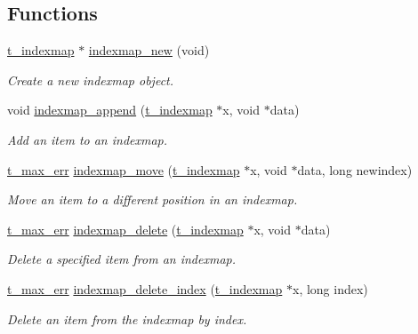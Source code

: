 \subsection*{Functions}
\begin{DoxyCompactItemize}
\item 
\hyperlink{structt__indexmap}{t\_\-indexmap} $\ast$ \hyperlink{group__indexmap_ga2e7303d05103b7e42c1a12929f5233ec}{indexmap\_\-new} (void)
\begin{DoxyCompactList}\small\item\em Create a new indexmap object. \item\end{DoxyCompactList}\item 
void \hyperlink{group__indexmap_ga5083e00af855e9b1a20ee5321c8fe3c9}{indexmap\_\-append} (\hyperlink{structt__indexmap}{t\_\-indexmap} $\ast$x, void $\ast$data)
\begin{DoxyCompactList}\small\item\em Add an item to an indexmap. \item\end{DoxyCompactList}\item 
\hyperlink{group__datatypes_ga73edaae82b318855cc09fac994918165}{t\_\-max\_\-err} \hyperlink{group__indexmap_gab5f2093d1eb48203117b8bfc32ea5c31}{indexmap\_\-move} (\hyperlink{structt__indexmap}{t\_\-indexmap} $\ast$x, void $\ast$data, long newindex)
\begin{DoxyCompactList}\small\item\em Move an item to a different position in an indexmap. \item\end{DoxyCompactList}\item 
\hyperlink{group__datatypes_ga73edaae82b318855cc09fac994918165}{t\_\-max\_\-err} \hyperlink{group__indexmap_ga6443c8bb19d6064f9aedacc170119215}{indexmap\_\-delete} (\hyperlink{structt__indexmap}{t\_\-indexmap} $\ast$x, void $\ast$data)
\begin{DoxyCompactList}\small\item\em Delete a specified item from an indexmap. \item\end{DoxyCompactList}\item 
\hyperlink{group__datatypes_ga73edaae82b318855cc09fac994918165}{t\_\-max\_\-err} \hyperlink{group__indexmap_ga7d0117753b9ed42f977b63ab62603f71}{indexmap\_\-delete\_\-index} (\hyperlink{structt__indexmap}{t\_\-indexmap} $\ast$x, long index)
\begin{DoxyCompactList}\small\item\em Delete an item from the indexmap by index. \item\end{DoxyCompactList}\item 

\end{DoxyCompactItemize}
